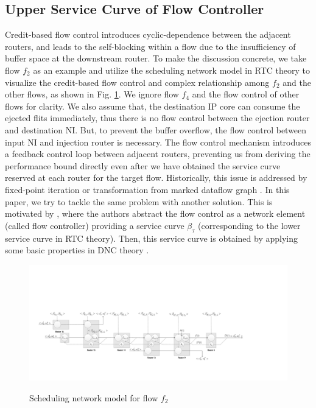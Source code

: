 \documentclass[10pt,journal]{IEEEtran}
\begin{document}
\subsection{Upper Service Curve of Flow Controller}\label{flowcontrol}
Credit-based flow control introduces cyclic-dependence between the adjacent routers, and leads to the self-blocking within a flow due to the insufficiency of buffer space at the downstream router. To make the discussion concrete, we take flow $f_2$ as an example and utilize the scheduling network model \cite{1253607} in RTC theory to visualize the credit-based flow control and complex relationship among $f_2$ and the other flows, as shown in Fig. \ref{f2}. We ignore flow $f_4$ and the flow control of other flows for clarity. We also assume that, the destination IP core can consume the ejected flits immediately, thus there is no flow control between the ejection router and destination NI. But, to prevent the buffer overflow, the flow control between input NI and injection router is necessary. The flow control mechanism introduces a feedback control loop between adjacent routers, preventing us from deriving the performance bound directly even after we have obtained the service curve reserved at each router for the target flow. Historically, this issue is addressed  by fixed-point iteration \cite{schioler2005network} or transformation from marked dataflow graph \cite{Thiele:2009:MPA:1629335.1629353}. In this paper, we try to tackle the same problem with another solution. This is motivated by \cite{qian2009analysis}, where the authors abstract the flow control as a network element (called flow controller) providing a service curve $\beta_{\tau}$ (corresponding to the lower service curve in RTC theory). Then, this service curve is obtained by applying some basic properties in DNC theory \cite{Boudec2001Network}.
\begin{figure}
  \centering
  \includegraphics[scale=0.35]{figures/f2.pdf}\\
  \caption{Scheduling network model for flow $f_2$}\label{f2}
\end{figure}
\end{document}
